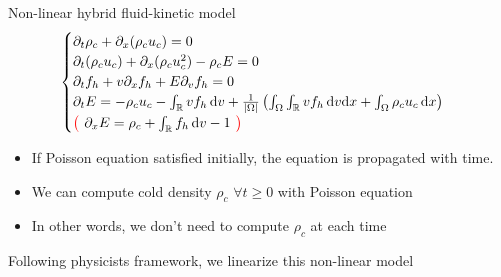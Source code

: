\documentclass{beamer}
\begin{document}
\begin{frame}{Non-linear hybrid fluid-kinetic model}
  $$
    \begin{cases}
      \partial_t \rho_c + \partial_x(\rho_cu_c) = 0\\
      \partial_t(\rho_cu_c) + \partial_x(\rho_cu_c^2)-\rho_cE = 0\\
      \partial_tf_h + v\partial_xf_h + E\partial_vf_h = 0\\
      \partial_tE = -\rho_cu_c - \int_\mathbb{R}vf_h\,\mathrm{d}v + \frac{1}{|\Omega|}\left(\int_\Omega\int_\mathbb{R}vf_h\,\mathrm{d}v\mathrm{d}x + \int_\Omega\rho_cu_c\,\mathrm{d}x \right)\\
      {\color{red}\left(\phantom{\frac{}{}}\right.} \partial_xE = \rho_c + \int_\mathbb{R}f_h\,\mathrm{d}v - 1 {\color{red}\left.\phantom{\frac{}{}}\right)}
    \end{cases}
  $$
  \begin{itemize}
    \item If Poisson equation satisfied initially, the equation is propagated with time.
    \item We can compute cold density $\rho_c$ $\forall t\geq0$ with Poisson equation
    \item In other words, we don't need to compute $\rho_c$ at each time
  \end{itemize}
  Following physicists framework, we linearize this non-linear model
\end{frame}
\end{document}
